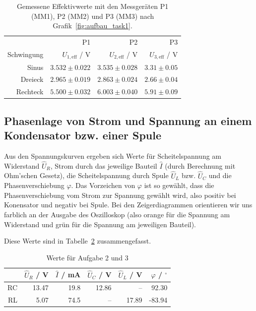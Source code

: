 \documentclass{article}
\begin{document}
\begin{table}[H]
\centering
\caption{Gemessene Effektivwerte mit den Messgeräten P1 (MM1), P2 (MM2) und P3 (MM3) nach Grafik~\ref{fig:aufbau_task1}.}
\label{tab:auswertung_task1_volt}
\begin{tabular}{r|rrr}
& P1 & P2 & P3 \\
Schwingung & $U_{1,\text{eff}}$ / V  & $U_{2,\text{eff}}$ / V & $U_{3,\text{eff}}$ / V \\
\hline
Sinus & $3.532\pm 0.022$ & $3.535 \pm 0.028$ & $3.31 \pm 0.05$ \\
Dreieck & $2.965\pm 0.019$ & $2.863 \pm 0.024$ & $2.66 \pm 0.04$ \\
Rechteck & $5.500\pm 0.032$ & $6.003 \pm 0.040$ & $5.91 \pm 0.09$
\end{tabular}
\end{table}





\subsection{Phasenlage von Strom und Spannung an einem Kondensator bzw. einer Spule}


Aus den Spannungskurven ergeben sich Werte für Scheitelspannung am Widerstand $\hat U_R$, Strom durch das jeweilige Bauteil $\hat I$ (durch Berechnung mit Ohm'schen Gesetz), die Scheitelspannung durch Spule $\hat U_L$ bzw. $\hat U_C$ und die Phasenverschiebung $\varphi$. Das Vorzeichen von $\varphi$ ist so gewählt, dass die Phasenverschiebung vom Strom zur Spannung gewählt wird, also positiv bei Konensator und negativ bei Spule. Bei den Zeigerdiagrammen orientieren wir uns farblich an der Ausgabe des Oszilloskop (also orange für die Spannung am Widerstand und grün für die Spannung am jeweiligen Bauteil).

Diese Werte sind in Tabelle~\ref{tab:task23_auswertung} zusammengefasst.
\begin{table}[H]
\caption{Werte für Aufgabe 2 und 3}
\label{tab:task23_auswertung}
\begin{tabular}{r|rrrrr}
& $\hat U_R$ / V & $\hat I$ / mA & $\hat U_C$ / V & $\hat U_L$ / V & $\varphi$ / ${}^\circ$ \\
\hline
RC & 13.47 & 19.8 & 12.86 & -- & 92.30\\
RL & 5.07 & 74.5 & -- &  17.89 & -83.94
\end{tabular}

\end{table}
\end{document}
